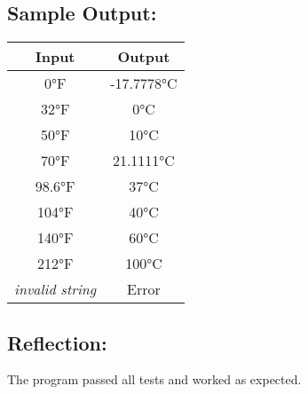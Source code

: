 \documentclass[main.tex]{subfiles}
\begin{document}
        \subsection*{Sample Output:}
            \begin{center}
                \begin{tabular}{|c|c|}
                    \hline
                    \textbf{Input} & \textbf{Output} \\
                    \hline
                    0°F & -17.7778°C \\
                    \hline
                    32°F & 0°C \\
                    \hline
                    50°F & 10°C \\
                    \hline
                    70°F & 21.1111°C \\
                    \hline
                    98.6°F & 37°C \\
                    \hline
                    104°F & 40°C \\
                    \hline
                    140°F & 60°C \\
                    \hline
                    212°F & 100°C \\
                    \hline
                    \textit{invalid string} & Error \\
                    \hline
                \end{tabular}
            \end{center}

        \subsection*{Reflection:}
            The program passed all tests and worked as expected.
\end{document}
